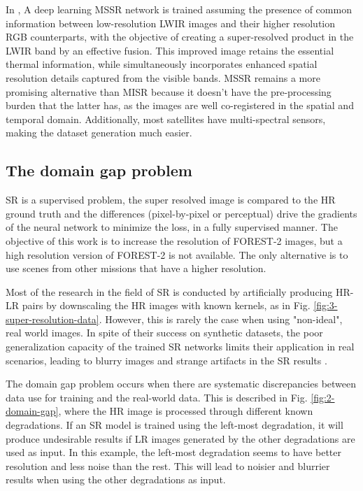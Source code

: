         In \cite{myself2023}, A deep learning MSSR network is trained assuming the presence of common information between low-resolution LWIR images and their higher resolution RGB counterparts, with the objective of creating a super-resolved product in the LWIR band by an effective fusion. This improved image retains the essential thermal information, while simultaneously incorporates enhanced spatial resolution details captured from the visible bands. 
        MSSR remains a more promising alternative than MISR because it doesn't have the pre-processing burden that the latter has, as the images are well co-registered in the spatial and temporal domain.
        Additionally, most satellites have multi-spectral sensors, making the dataset generation much easier.

    \subsection{The domain gap problem} \label{subsec:domaingap}
 
        SR is a supervised problem, the super resolved image is compared to the HR ground truth and the differences (pixel-by-pixel or perceptual) drive the gradients of the neural network to minimize the loss, in a fully supervised manner. 
        The objective of this work is to increase the resolution of FOREST-2 images, but a high resolution version of FOREST-2 is not available. 
        The only alternative is to use scenes from other missions that have a higher resolution.

        Most of the research in the field of SR is conducted by artificially producing HR-LR pairs by downscaling the HR images with known kernels, as in Fig. \ref{fig:3-super-resolution-data}.
        However, this is rarely the case when using "non-ideal", real world images.
        In spite of their success on synthetic datasets, the poor generalization capacity of the trained SR networks limits their application in real scenarios, leading to blurry images and strange artifacts in the SR results \cite{lugmayr2020ntire}.

        The domain gap problem occurs when there are systematic discrepancies between data use for training and the real-world data. 
        This is described in Fig. \ref{fig:2-domain-gap}, where the HR image is processed through different known degradations. 
        If an SR model is trained using the left-most degradation, it will produce undesirable results if LR images generated by the other degradations are used as input.
        In this example, the left-most degradation seems to have better resolution and less noise than the rest. This will lead to noisier and blurrier results when using the other degradations as input.

